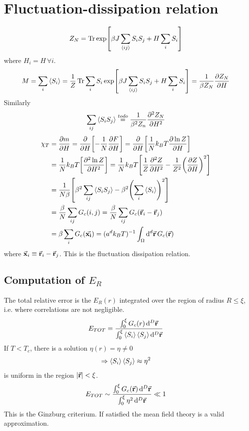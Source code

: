 \documentclass[../main/main.tex]{subfiles}
\begin{document}
\section{Fluctuation-dissipation relation}
\begin{equation}
  Z_N = \Tr \exp [ \beta J \sum_{\expval{ij} }^{} S_i S_j + H \sum_{i}^{} S_i    ]
\end{equation}
where \( H_i = H\, \forall i \).
\begin{equation}
  M = \sum_{i}^{} \expval{S_i} = \frac{1}{Z} \Tr \sum_{i}^{} S_i    \exp [ \beta J \sum_{\expval{ij} }^{} S_i S_j + H \sum_{i}^{} S_i    ] = \frac{1}{\beta Z_N} \pdv{Z_N}{H}
\end{equation}
Similarly
\begin{equation}
  \sum_{ij}^{} \expval{S_i S_j} \overset{to do}{=} \frac{1}{\beta ^2 Z_n} \pdv[2]{Z_N}{H}
\end{equation}
\begin{equation}
\begin{split}
  \chi _T & = \pdv{m}{H} = \pdv{}{H} \qty[- \frac{1}{N} \pdv{F}{H} ] = \pdv{}{H}  \qty[\frac{1}{N} k_B T \pdv{\ln{Z} }{H} ] \\
  & = \frac{1}{N} k_B T \qty[\pdv[2]{\ln{Z} }{H} ] = \frac{1}{N} k_B T \qty[\frac{1}{Z} \pdv[2]{Z}{H} - \frac{1}{Z^2} \qty(\pdv{Z}{H} )^2 ] \\
  & = \frac{1}{N \beta } \qty[\beta ^2 \sum_{ij}^{} \expval{S_i S_j}  - \beta ^2 \qty(\sum_{i}^{} \expval{S_i}  )^2   ] \\
  & = \frac{\beta }{N} \sum_{ij}^{}  G_c (i,j) = \frac{\beta }{N} \sum_{ij}^{} G_c (\va{r}_i - \va{r}_j) \\
  & = \beta \sum_{i}^{} G_c (\va{x_i}) = (a^d k_B T)^{-1} \int_{\Omega }^{} \dd[d]{\va{r}} G_c (\va{r})
\end{split}
\end{equation}
where \( \va{x}_i \equiv \va{r}_i - \va{r}_j \). This is the fluctuation dissipation relation.
\subsection{Computation of \( E_ R  \)}
The total relative error is the \( E_R (r)\) integrated over the region of radius \( R \le \xi  \), i.e. where correlations are not negligible.
\begin{equation}
  E_{TOT} = \frac{\int_{0}^{\xi } G_c (r) \dd[D]{\va{r}}  }{\int_{0}^{\xi }\expval{S_i} \expval{S_j}  \dd[D]{\va{r}} }
\end{equation}
If \( T < T_c \), there is a solution \( \eta (r) = \eta \neq 0 \)
\begin{equation}
  \Rightarrow \expval{S_i} \expval{S_j} \approx \eta ^2
\end{equation}
is uniform in the region \( \abs{\va{r}} < \xi   \).
\begin{equation}
  E_{TOT} \sim \frac{\int_{0}^{\xi } G_c (\va{r}) \dd[D]{\va{r}}  }{\int_{0}^{\xi } \eta ^2 \dd[D]{\va{r}}  } \ll 1
  \label{eq:16_2}
\end{equation}
This is the Ginzburg criterium. If satisfied the mean field theory is a valid approximation.
\end{document}
